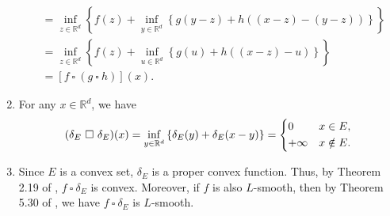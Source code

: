 \documentclass[11 pt]{article}
\begin{document}
\begin{enumerate}[(1)]
\begin{align*}
			&=\inf_{z \in\mathbb{R}^d}\left\{f(z)+\inf_{y\in\mathbb{R}^d}\left\{g(y-z)+h((x-z)-(y-z))\right\}\right\}\\
			&=\inf_{z \in\mathbb{R}^d}\left\{f(z)+\inf_{u\in\mathbb{R}^d}\left\{g(u)+h((x-z)-u)\right\}\right\}\tag{Change of variable: $u=y-z$}\\
			&=\left[f ~\square~ (g ~\square~ h)\right](x).
		\end{align*}
		\item For any $x\in\mathbb{R}^d$, we have
		\begin{align*}
			(\delta_E ~\square~ \delta_E)(x)=\inf_{y \in \mathbb{R}^d}\left\{\delta_E(y)+\delta_E(x-y)\right\}
			=\begin{dcases}
				0 &x\in E,\\
				+\infty &x\notin E.
			\end{dcases}
		\end{align*}
		\item Since $E$ is a convex set, $\delta_E$ is a proper convex function. Thus, by Theorem 2.19 of \cite{beck2017first}, $f ~\square~ \delta_E$ is convex. Moreover, if $f$ is also $L$-smooth, then by Theorem 5.30 of \cite{beck2017first}, we have $f ~\square~ \delta_E$ is $L$-smooth. 
	\end{enumerate}
	
\end{document}
